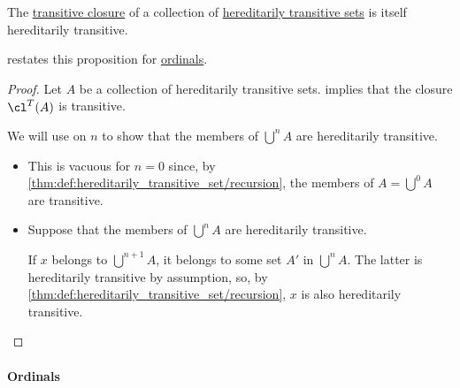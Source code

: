 \begin{corollary}\label{thm:closure_of_collection_of_hereditarily_transitive_sets}
  The \hyperref[def:set_transitive_closure]{transitive closure} of a collection of \hyperref[def:hereditarily_transitive_set]{hereditarily transitive sets} is itself hereditarily transitive.
\end{corollary}
\begin{comments}
  \item {} restates this proposition for \hyperref[def:ordinal]{ordinals}.
\end{comments}
\begin{proof}
  Let \( A \) be a collection of hereditarily transitive sets.  implies that the closure \( \cl^T(A) \) is transitive.

  We will use  on \( n \) to show that the members of \( {\bigcup}^n A \) are hereditarily transitive.
  \begin{itemize}
    \item This is vacuous for \( n = 0 \) since, by \cref{thm:def:hereditarily_transitive_set/recursion}, the members of \( A = {\bigcup}^0 A \) are transitive.

    \item Suppose that the members of \( {\bigcup}^n A \) are hereditarily transitive.

    If \( x \) belongs to \( {\bigcup}^{n+1} A \), it belongs to some set \( A' \) in \( {\bigcup}^n A \). The latter is hereditarily transitive by assumption, so, by \cref{thm:def:hereditarily_transitive_set/recursion}, \( x \) is also hereditarily transitive.
  \end{itemize}
\end{proof}

\paragraph{Ordinals}

